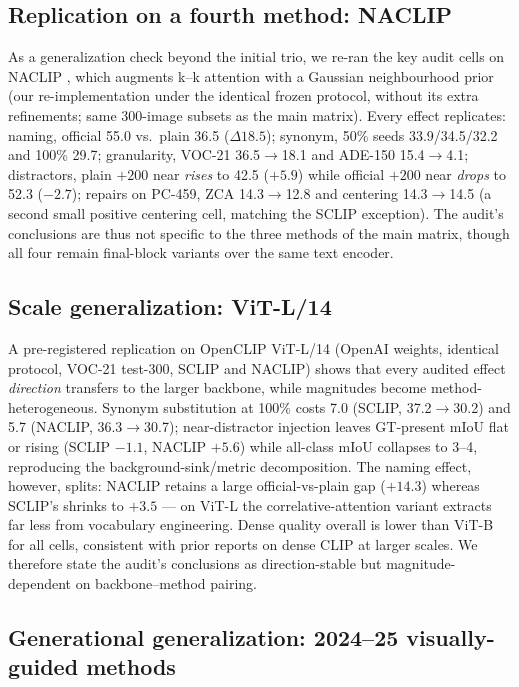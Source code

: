\documentclass[11pt]{article}
\newcommand{\miou}{mIoU}
\begin{document}
\subsection{Replication on a fourth method: NACLIP}
\label{sec:naclip}

As a generalization check beyond the initial trio, we re-ran the key audit cells on
NACLIP \citep{hajimiri2024naclip}, which augments k--k attention with a Gaussian
neighbourhood prior (our re-implementation under the identical frozen protocol,
without its extra refinements; same 300-image subsets as the main matrix).
Every effect replicates: naming, official 55.0 vs.\
plain 36.5 ($\Delta 18.5$); synonym, 50\% seeds 33.9/34.5/32.2 and 100\% 29.7;
granularity, VOC-21 36.5$\to$18.1 and ADE-150 15.4$\to$4.1; distractors, plain $+200$
near \emph{rises} to 42.5 ($+5.9$) while official $+200$ near \emph{drops} to 52.3
($-2.7$); repairs on PC-459, ZCA 14.3$\to$12.8 and centering 14.3$\to$14.5 (a second
small positive centering cell, matching the SCLIP exception). The audit's conclusions
are thus not specific to the three methods of the main matrix, though all four remain
final-block variants over the same text encoder.

\subsection{Scale generalization: ViT-L/14}
\label{sec:vitl}

A pre-registered replication on OpenCLIP ViT-L/14 (OpenAI weights, identical
protocol, VOC-21 test-300, SCLIP and NACLIP) shows that every audited effect
\emph{direction} transfers to the larger backbone, while magnitudes become
method-heterogeneous. Synonym substitution at 100\% costs 7.0 (SCLIP,
37.2$\to$30.2) and 5.7 (NACLIP, 36.3$\to$30.7); near-distractor injection leaves
GT-present \miou{} flat or rising (SCLIP $-1.1$, NACLIP $+5.6$) while all-class
\miou{} collapses to 3--4, reproducing the background-sink/metric decomposition.
The naming effect, however, splits: NACLIP retains a large official-vs-plain gap
($+14.3$) whereas SCLIP's shrinks to $+3.5$ --- on ViT-L the correlative-attention
variant extracts far less from vocabulary engineering. Dense quality overall is
lower than ViT-B for all cells, consistent with prior reports on dense CLIP at
larger scales. We therefore state the audit's conclusions as direction-stable but
magnitude-dependent on backbone--method pairing.

\subsection{Generational generalization: 2024--25 visually-guided methods}
\label{sec:newgen}
\end{document}
